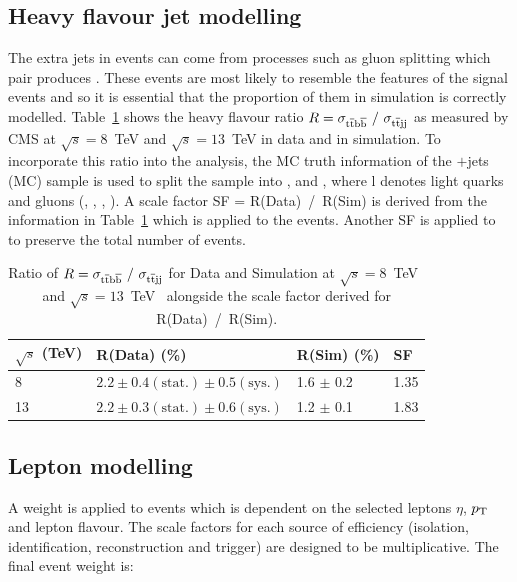 \subsection{Heavy flavour jet modelling ~\label{ttbbmod}}
The extra jets in \ttbar events can come from processes such as gluon splitting which pair produces \bbbar. These \ttbb events are most likely to resemble the features of the \tttt signal events and so it is essential that the proportion of them in simulation is correctly modelled. Table~\ref{tab:heavyflavR} shows the heavy flavour ratio $R= \sigma_{\mathrm{t}\overline{\mathrm{t}}\mathrm{b}\overline{\mathrm{b}}}~/~ \sigma_{\mathrm{t}\overline{\mathrm{t}} \textrm{jj} }$ as measured by CMS at $\sqrt{s}=8$~TeV and $\sqrt{s}=13$~TeV in data and in simulation. To incorporate this ratio into the analysis, the MC truth information of the \ttbar$+$jets (MC) sample is used to split the sample into \ttbb, \ttcc and \ttll, where l denotes light quarks and gluons (\cPqu, \cPqd, \cPqs, \cPg).  A scale factor SF = R(Data)~/~R(Sim) is derived from the information in Table~\ref{tab:heavyflavR} which is applied to the \ttbb events. Another SF is applied to \ttll to preserve the total number of \ttbar events.


\begin{table}[htpb!]
\footnotesize
\begin{center}
\begin{tabular}{|l|l|l|l|}
\hline
$\sqrt{s}$ (TeV)                         & R(Data)  (\%)                                                                             & R(Sim) (\%)       & SF   \\
\hline
8  & $2.2 \pm 0.4 \left( \textrm{stat.} \right) \pm 0.5 \left(\textrm{sys.} \right)$ & 1.6 $\pm$ 0.2 & 1.35 \\
13 & $2.2 \pm 0.3 \left( \textrm{stat.} \right) \pm 0.6 \left(\textrm{sys.} \right)$ & 1.2 $\pm$ 0.1 & 1.83 \\
\hline
\end{tabular}
\caption{Ratio of $R= \sigma_{\mathrm{t}\overline{\mathrm{t}}\mathrm{b}\overline{\mathrm{b}}}~/~ \sigma_{\mathrm{t}\overline{\mathrm{t}} \textrm{jj} }$ for Data and Simulation at $\sqrt{s}=8$~TeV~\cite{Khachatryan2015132} and $\sqrt{s}=13$~TeV~\cite{CMS-PAS-TOP-16-010} alongside the scale factor derived for R(Data)~/~R(Sim).}
\label{tab:heavyflavR}
\end{center}
\end{table}

\subsection{Lepton modelling}
A weight is applied to events which is dependent on the selected leptons $\eta$, $p_{\mathrm{T}}$ and lepton flavour. The scale factors for each source of efficiency (isolation, identification, reconstruction and trigger) are designed to be multiplicative. The final event weight is:

